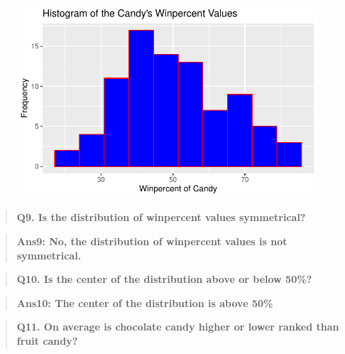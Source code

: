 \documentclass[
  letterpaper,
  DIV=11,
  numbers=noendperiod]{scrartcl}
\newenvironment{Shaded}{\begin{snugshade}}{\end{snugshade}}
\newcommand{\FunctionTok}[1]{\textcolor[rgb]{0.28,0.35,0.67}{#1}}
\newcommand{\NormalTok}[1]{\textcolor[rgb]{0.00,0.23,0.31}{#1}}
\newcommand{\OtherTok}[1]{\textcolor[rgb]{0.00,0.23,0.31}{#1}}
\newcommand{\SpecialCharTok}[1]{\textcolor[rgb]{0.37,0.37,0.37}{#1}}
\begin{document}
\begin{figure}[H]

{\centering \includegraphics{class10_files/figure-pdf/unnamed-chunk-10-1.pdf}

}

\end{figure}

\begin{quote}
\textbf{Q9. Is the distribution of winpercent values symmetrical?}
\end{quote}

\begin{quote}
\textbf{Ans9: No, the distribution of winpercent values is not
symmetrical.}
\end{quote}

\begin{quote}
\textbf{Q10. Is the center of the distribution above or below 50\%?}
\end{quote}

\begin{quote}
\textbf{Ans10: The center of the distribution is above 50\%}
\end{quote}

\begin{quote}
\textbf{Q11. On average is chocolate candy higher or lower ranked than
fruit candy?}
\end{quote}

\begin{Shaded}
\end{Shaded}
\end{document}
